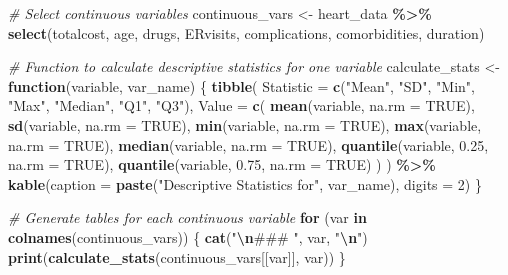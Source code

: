 \documentclass[
]{article}
\newenvironment{Shaded}{\begin{snugshade}}{\end{snugshade}}
\newcommand{\AttributeTok}[1]{\textcolor[rgb]{0.13,0.29,0.53}{#1}}
\newcommand{\CommentTok}[1]{\textcolor[rgb]{0.56,0.35,0.01}{\textit{#1}}}
\newcommand{\ConstantTok}[1]{\textcolor[rgb]{0.56,0.35,0.01}{#1}}
\newcommand{\ControlFlowTok}[1]{\textcolor[rgb]{0.13,0.29,0.53}{\textbf{#1}}}
\newcommand{\DecValTok}[1]{\textcolor[rgb]{0.00,0.00,0.81}{#1}}
\newcommand{\FloatTok}[1]{\textcolor[rgb]{0.00,0.00,0.81}{#1}}
\newcommand{\FunctionTok}[1]{\textcolor[rgb]{0.13,0.29,0.53}{\textbf{#1}}}
\newcommand{\NormalTok}[1]{#1}
\newcommand{\OtherTok}[1]{\textcolor[rgb]{0.56,0.35,0.01}{#1}}
\newcommand{\SpecialCharTok}[1]{\textcolor[rgb]{0.81,0.36,0.00}{\textbf{#1}}}
\newcommand{\StringTok}[1]{\textcolor[rgb]{0.31,0.60,0.02}{#1}}
\begin{document}
\begin{Shaded}
\begin{Highlighting}[]
\CommentTok{\# Select continuous variables}
\NormalTok{continuous\_vars }\OtherTok{\textless{}{-}}\NormalTok{ heart\_data }\SpecialCharTok{\%\textgreater{}\%}
  \FunctionTok{select}\NormalTok{(totalcost, age, drugs, ERvisits, complications, comorbidities, duration)}

\CommentTok{\# Function to calculate descriptive statistics for one variable}
\NormalTok{calculate\_stats }\OtherTok{\textless{}{-}} \ControlFlowTok{function}\NormalTok{(variable, var\_name) \{}
  \FunctionTok{tibble}\NormalTok{(}
    \AttributeTok{Statistic =} \FunctionTok{c}\NormalTok{(}\StringTok{"Mean"}\NormalTok{, }\StringTok{"SD"}\NormalTok{, }\StringTok{"Min"}\NormalTok{, }\StringTok{"Max"}\NormalTok{, }\StringTok{"Median"}\NormalTok{, }\StringTok{"Q1"}\NormalTok{, }\StringTok{"Q3"}\NormalTok{),}
    \AttributeTok{Value =} \FunctionTok{c}\NormalTok{(}
      \FunctionTok{mean}\NormalTok{(variable, }\AttributeTok{na.rm =} \ConstantTok{TRUE}\NormalTok{),}
      \FunctionTok{sd}\NormalTok{(variable, }\AttributeTok{na.rm =} \ConstantTok{TRUE}\NormalTok{),}
      \FunctionTok{min}\NormalTok{(variable, }\AttributeTok{na.rm =} \ConstantTok{TRUE}\NormalTok{),}
      \FunctionTok{max}\NormalTok{(variable, }\AttributeTok{na.rm =} \ConstantTok{TRUE}\NormalTok{),}
      \FunctionTok{median}\NormalTok{(variable, }\AttributeTok{na.rm =} \ConstantTok{TRUE}\NormalTok{),}
      \FunctionTok{quantile}\NormalTok{(variable, }\FloatTok{0.25}\NormalTok{, }\AttributeTok{na.rm =} \ConstantTok{TRUE}\NormalTok{),}
      \FunctionTok{quantile}\NormalTok{(variable, }\FloatTok{0.75}\NormalTok{, }\AttributeTok{na.rm =} \ConstantTok{TRUE}\NormalTok{)}
\NormalTok{    )}
\NormalTok{  ) }\SpecialCharTok{\%\textgreater{}\%}
    \FunctionTok{kable}\NormalTok{(}\AttributeTok{caption =} \FunctionTok{paste}\NormalTok{(}\StringTok{"Descriptive Statistics for"}\NormalTok{, var\_name), }\AttributeTok{digits =} \DecValTok{2}\NormalTok{)}
\NormalTok{\}}

\CommentTok{\# Generate tables for each continuous variable}
\ControlFlowTok{for}\NormalTok{ (var }\ControlFlowTok{in} \FunctionTok{colnames}\NormalTok{(continuous\_vars)) \{}
  \FunctionTok{cat}\NormalTok{(}\StringTok{"}\SpecialCharTok{\textbackslash{}n}\StringTok{\#\#\# "}\NormalTok{, var, }\StringTok{"}\SpecialCharTok{\textbackslash{}n}\StringTok{"}\NormalTok{)}
  \FunctionTok{print}\NormalTok{(}\FunctionTok{calculate\_stats}\NormalTok{(continuous\_vars[[var]], var))}
\NormalTok{\}}
\end{Highlighting}
\end{Shaded}
\end{document}
